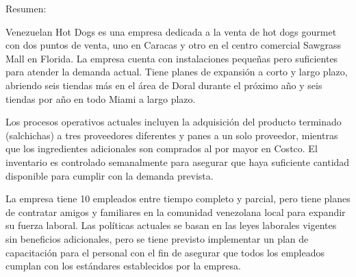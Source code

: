 Resumen:

Venezuelan Hot Dogs es una empresa dedicada a la venta de hot dogs gourmet con dos puntos de venta, uno en Caracas y otro en el centro comercial Sawgrass Mall en Florida. La empresa cuenta con instalaciones pequeñas pero suficientes para atender la demanda actual. Tiene planes de expansión a corto y largo plazo, abriendo seis tiendas más en el área de Doral durante el próximo año y seis tiendas por año en todo Miami a largo plazo.

Los procesos operativos actuales incluyen la adquisición del producto terminado (salchichas) a tres proveedores diferentes y panes a un solo proveedor, mientras que los ingredientes adicionales son comprados al por mayor en Costco. El inventario es controlado semanalmente para asegurar que haya suficiente cantidad disponible para cumplir con la demanda prevista.

La empresa tiene 10 empleados entre tiempo completo y parcial, pero tiene planes de contratar amigos y familiares en la comunidad venezolana local para expandir su fuerza laboral. Las políticas actuales se basan en las leyes laborales vigentes sin beneficios adicionales, pero se tiene previsto implementar un plan de capacitación para el personal con el fin de asegurar que todos los empleados cumplan con los estándares establecidos por la empresa.